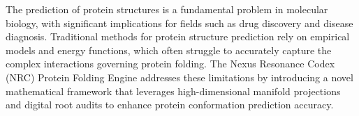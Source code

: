 The prediction of protein structures is a fundamental problem in molecular biology, with significant implications for fields such as drug discovery and disease diagnosis. Traditional methods for protein structure prediction rely on empirical models and energy functions, which often struggle to accurately capture the complex interactions governing protein folding. The Nexus Resonance Codex (NRC) Protein Folding Engine addresses these limitations by introducing a novel mathematical framework that leverages high-dimensional manifold projections and digital root audits to enhance protein conformation prediction accuracy.